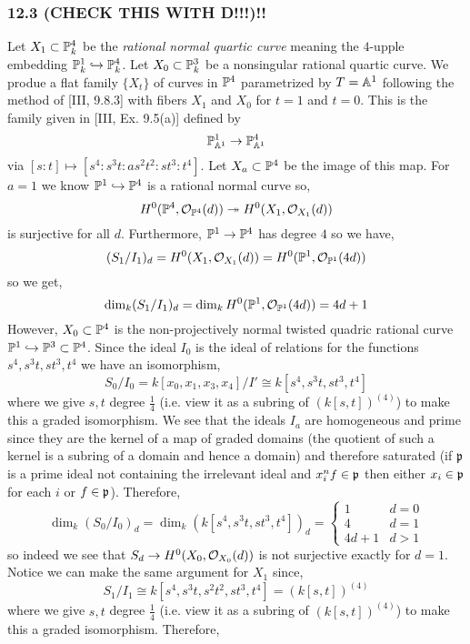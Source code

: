 \documentclass[12pt]{article}
\begin{document}
\subsubsection{12.3 (CHECK THIS WITH D!!!)!!}

Let $X_1 \subset \P^4_k$ be the \textit{rational normal quartic curve} meaning the $4$-upple embedding $\P^1_k \embed \P^4_k$. Let $X_0 \subset \P^3_k$ be a nonsingular rational quartic curve. We produe a flat family $\{ X_t \}$ of curves in $\P^4$ parametrized by $T = \A^1$ following the method of [III, 9.8.3] with fibers $X_1$ and $X_0$ for $t = 1$ and $t = 0$. This is the family given in [III, Ex. 9.5(a)] defined by
\[ \P^1_{\A^1} \to \P^4_{\A^1} \]
via $[s:t] \mapsto [s^4 : s^3 t : a s^2 t^2 : s t^3 : t^4]$. Let $X_a \subset \P^4$ be the image of this map. For $a = 1$ we know $\P^1 \embed \P^4$ is a rational normal curve so,
\[ H^0(\P^4, \struct{\P^4}(d)) \onto H^0(X_1, \struct{X_1}(d)) \]
is surjective for all $d$. Furthermore, $\P^1 \to \P^4$ has degree $4$ so we have,
\[ (S_1/I_1)_d =  H^0(X_1, \struct{X_1}(d)) = H^0(\P^1, \struct{\P^1}(4d)) \]
so we get,
\[ \dim_{k}(S_1/I_1)_d = \dim_{k} H^0(\P^1, \struct{\P^1}(4d)) = 4d + 1 \]
However, $X_0 \subset \P^4$ is the non-projectively normal twisted quadric rational curve $\P^1 \embed \P^3 \subset \P^4$. Since the ideal $I_0$ is the ideal of relations for the functions $s^4, s^3 t, s t^3, t^4$ we have an isomorphism,
\[ S_0/I_0 = k[x_0, x_1, x_3, x_4]/I' \cong k[s^4, s^3 t, s t^3, t^4] \] 
where we give $s,t$ degree $\frac{1}{4}$ (i.e. view it as a subring of $(k[s,t])^{(4)}$) to make this a graded isomorphism. We see that the ideals $I_a$ are homogeneous and prime since they are the kernel of a map of graded domains (the quotient of such a kernel is a subring of a domain and hence a domain) and therefore saturated (if $\p$ is a prime ideal not containing the irrelevant ideal and $x_i^{n} f \in \p$ then either $x_i \in \p$ for each $i$ or $f \in \p$). Therefore,
\[ \dim_{k} (S_0 / I_0)_d = \dim_k (k[s^4, s^3 t, s t^3, t^4])_d = 
\begin{cases}
1 & d = 0
\\
4 & d = 1
\\
4 d + 1 & d > 1
\end{cases} \]
so indeed we see that $S_d \to H^0(X_0, \struct{X_0}(d))$ is not surjective exactly for $d = 1$. Notice we can make the same argument for $X_1$ since,
\[ S_1 / I_1 \cong k[s^4, s^3 t, s^2 t^2, s t^3, t^4] = (k[s,t])^{(4)} \]
where we give $s,t$ degree $\frac{1}{4}$ (i.e. view it as a subring of $(k[s,t])^{(4)}$) to make this a graded isomorphism. Therefore,
\end{document}
